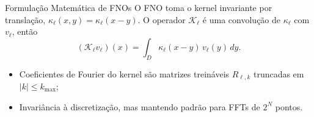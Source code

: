\begin{frame}{Formulação Matemática de FNOs}
  \setlength{\abovedisplayskip}{4pt}\setlength{\belowdisplayskip}{4pt}%
  O FNO \parencite{li2021} toma o kernel invariante por translação,
  $\kappa_\ell(x,y) = \kappa_\ell(x-y)$.
  O operador $\mathcal{K}_\ell$ é uma convolução de $\kappa_\ell$ com $v_\ell$, então
  \begin{equation*}
    (\mathcal{K}_\ell v_\ell)(x) = \int_D \kappa_\ell(x-y)\,v_\ell(y)\,dy.
  \end{equation*}
  \begin{itemize}
    \item<3-> Coeficientes de Fourier do kernel são matrizes treináveis $R_{\ell,k}$ truncadas em $|k| \le k_{\max}$;
    \item<4-> Invariância à discretização, mas mantendo padrão para FFTs de $2^N$ pontos.
  \end{itemize}
\end{frame}

